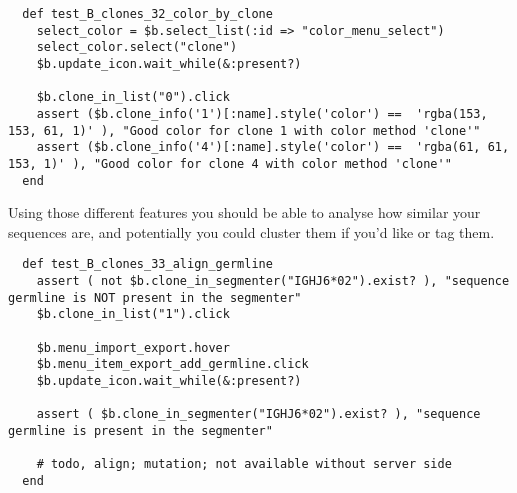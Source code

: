 \begin{verbatim}
  def test_B_clones_32_color_by_clone
    select_color = $b.select_list(:id => "color_menu_select")
    select_color.select("clone")
    $b.update_icon.wait_while(&:present?)

    $b.clone_in_list("0").click
    assert ($b.clone_info('1')[:name].style('color') ==  'rgba(153, 153, 61, 1)' ), "Good color for clone 1 with color method 'clone'"
    assert ($b.clone_info('4')[:name].style('color') ==  'rgba(61, 61, 153, 1)' ), "Good color for clone 4 with color method 'clone'"
  end
\end{verbatim}


Using those different features you should be able to analyse how similar your
sequences are, and potentially you could cluster them if you'd like or tag them.

\begin{verbatim}
  def test_B_clones_33_align_germline
    assert ( not $b.clone_in_segmenter("IGHJ6*02").exist? ), "sequence germline is NOT present in the segmenter"
    $b.clone_in_list("1").click

    $b.menu_import_export.hover
    $b.menu_item_export_add_germline.click
    $b.update_icon.wait_while(&:present?)

    assert ( $b.clone_in_segmenter("IGHJ6*02").exist? ), "sequence germline is present in the segmenter"

    # todo, align; mutation; not available without server side
  end
\end{verbatim}

